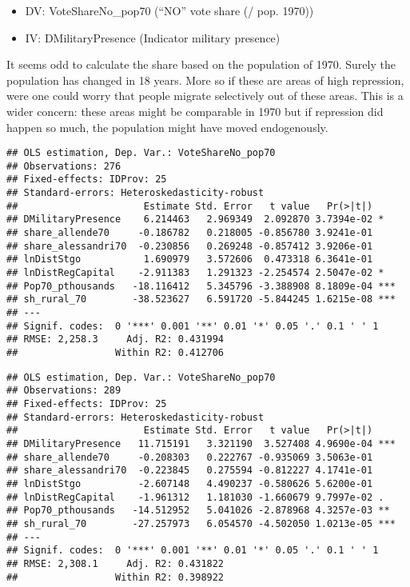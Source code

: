 \documentclass[
]{article}
\providecommand{\tightlist}{%
  \setlength{\itemsep}{0pt}\setlength{\parskip}{0pt}}
\begin{document}
\begin{itemize}
\tightlist
\item
  DV: VoteShareNo\_pop70 (``NO'' vote share (/ pop. 1970))
\item
  IV: DMilitaryPresence (Indicator military presence)
\end{itemize}

It seems odd to calculate the share based on the population of 1970.
Surely the population has changed in 18 years. More so if these are
areas of high repression, were one could worry that people migrate
selectively out of these areas. This is a wider concern: these areas
might be comparable in 1970 but if repression did happen so much, the
population might have moved endogenously.

\begin{verbatim}
## OLS estimation, Dep. Var.: VoteShareNo_pop70
## Observations: 276 
## Fixed-effects: IDProv: 25
## Standard-errors: Heteroskedasticity-robust 
##                      Estimate Std. Error   t value   Pr(>|t|)    
## DMilitaryPresence    6.214463   2.969349  2.092870 3.7394e-02 *  
## share_allende70     -0.186782   0.218005 -0.856780 3.9241e-01    
## share_alessandri70  -0.230856   0.269248 -0.857412 3.9206e-01    
## lnDistStgo           1.690979   3.572606  0.473318 6.3641e-01    
## lnDistRegCapital    -2.911383   1.291323 -2.254574 2.5047e-02 *  
## Pop70_pthousands   -18.116412   5.345796 -3.388908 8.1809e-04 ***
## sh_rural_70        -38.523627   6.591720 -5.844245 1.6215e-08 ***
## ---
## Signif. codes:  0 '***' 0.001 '**' 0.01 '*' 0.05 '.' 0.1 ' ' 1
## RMSE: 2,258.3     Adj. R2: 0.431994
##                 Within R2: 0.412706
\end{verbatim}

\begin{verbatim}
## OLS estimation, Dep. Var.: VoteShareNo_pop70
## Observations: 289 
## Fixed-effects: IDProv: 25
## Standard-errors: Heteroskedasticity-robust 
##                      Estimate Std. Error   t value   Pr(>|t|)    
## DMilitaryPresence   11.715191   3.321190  3.527408 4.9690e-04 ***
## share_allende70     -0.208303   0.222767 -0.935069 3.5063e-01    
## share_alessandri70  -0.223845   0.275594 -0.812227 4.1741e-01    
## lnDistStgo          -2.607148   4.490237 -0.580626 5.6200e-01    
## lnDistRegCapital    -1.961312   1.181030 -1.660679 9.7997e-02 .  
## Pop70_pthousands   -14.512952   5.041026 -2.878968 4.3257e-03 ** 
## sh_rural_70        -27.257973   6.054570 -4.502050 1.0213e-05 ***
## ---
## Signif. codes:  0 '***' 0.001 '**' 0.01 '*' 0.05 '.' 0.1 ' ' 1
## RMSE: 2,308.1     Adj. R2: 0.431822
##                 Within R2: 0.398922
\end{verbatim}
\end{document}
